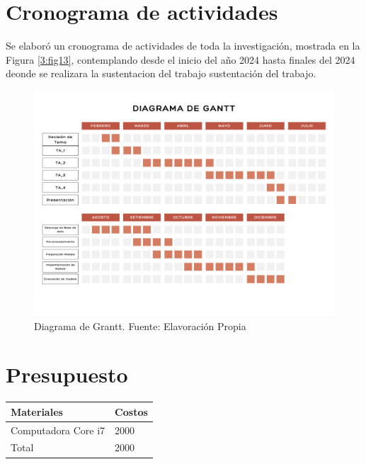 \section{Cronograma de actividades}

Se elaboró un cronograma de actividades de toda la investigación, mostrada en la Figura \ref{3:fig13}, contemplando desde el inicio del año 2024 hasta finales del 2024 deonde se realizara la sustentacion del trabajo sustentación del trabajo.

\begin{figure}[h]
	\begin{center}
		\includegraphics[width=1\textwidth]{3/figures/Cronograma Diagrama de Gantt.png}
		\caption{Diagrama de Grantt. Fuente: Elavoración Propia }
		\label{1:fig 18}
	\end{center}
\end{figure}




\section{Presupuesto}

\begin{center}
	\begin{tabular}{|p{8cm}|p{3cm}|}
		\hline
		Materiales & Costos  \\
		\hline
		Computadora Core i7 & 2000 \\
		\hline

		Total & 2000 \\
		\hline
	\end{tabular}
\end{center}


